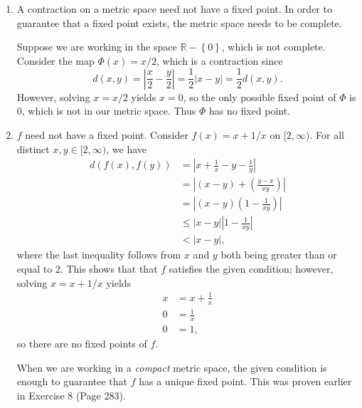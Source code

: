 \documentclass[10pt]{amsart}
\begin{document}
\begin{enumerate}
	\item A contraction on a metric space need not have a fixed point. In order to guarantee that a fixed point exists, the metric space needs to be complete.

	Suppose we are working in the space $\mathbb{R} - \left\{ 0 \right\}$, which is not complete. Consider the map $\Phi(x) = x / 2$, which is a contraction since
\[
	d(x,y) = \left| \frac{x}{2} -\frac{y}{2}  \right| = \frac{1}{2} |x-y| = \frac{1}{2} d(x,y).
\] 
However, solving $x = x/2$ yields $x=0$, so the only possible fixed point of $\Phi$ is 0, which is not in our metric space. Thus $\Phi$ has no fixed point.

\item $f$ need not have a fixed point. Consider $f(x) = x + 1/x$ on $[2, \infty)$. For all distinct $x,y \in [2, \infty)$, we have
	\begin{align*}
		d(f(x),f(y)) &= \left| x + \frac{1}{x} - y - \frac{1}{y}  \right| \\
			     &= \left| (x-y) + \left( \frac{y-x}{xy}  \right) \right| \\
			     &= \left| (x-y) \left( 1-\frac{1}{xy}  \right) \right| \\
			     &\leq |x-y| \left| 1- \frac{1}{xy} \right| \\
			     &< |x-y|,
	\end{align*}
	where the last inequality follows from $x$ and $y$ both being greater than or equal to 2. This shows that that $f$ satisfies the given condition; however, solving $x = x + 1/x$ yields
	\begin{align*}
		x &= x + \frac{1}{x} \\
		0 &= \frac{1}{x} \\
		0 &= 1,
	\end{align*}
	so there are no fixed points of $f$.

	When we are working in a \textit{compact} metric space, the given condition is enough to guarantee that $f$ has a unique fixed point. This was proven earlier in Exercise 8 (Page 283).
\end{enumerate}
\end{document}
